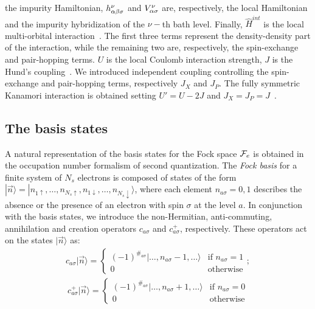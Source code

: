\documentclass[final,3p,10pt]{elsarticle}
\newcommand{\ket}[1]
{|#1\rangle}
\def\a{\alpha}       \def\b{\beta}   \def\g{\gamma}   \def\d{\delta}
\def\up{\uparrow} \def\down{\downarrow} \def\dw{\downarrow}
\begin{document}
the impurity Hamiltonian, 
$h_{\a\b\s}^\nu$ and $V_{\a\s}^\nu$ are, respectively, the local Hamiltonian
and the impurity hybridization of the $\nu-$th bath level. 
  Finally, $\hat{H}^{int}$ is the local
  multi-orbital interaction~\cite{Georges2013ACMP}.
  The first three terms represent the density-density part of the
  interaction, while the remaining two are,
  respectively, the spin-exchange and pair-hopping terms. 
  $U$ is the local Coulomb interaction strength, $J$ is the Hund's
  coupling~\cite{Georges2013ACMP}. We introduced
  independent coupling controlling the spin-exchange and pair-hopping terms,
  respectively $J_X$ and $J_P$. The fully symmetric Kanamori
  interaction is obtained setting $U'=U-2J$ and
  $J_X=J_P=J$~\cite{Georges2013ACMP}.

\subsection{The  basis states}\label{sSecBasis}
A natural representation of the basis states for the Fock space ${\cal F}_e$
is obtained in the occupation number formalism of second quantization.
The \textit{Fock basis} for a finite system of $N_s$ electrons is
composed of states of the form
$\ket{\vec{n}}=\ket{n_{1\up},\dots,n_{N_s\up},n_{1\dw},\dots,n_{N_s\dw}}$, 
where each element $n_{a\sigma}=0,1$ describes the absence or the
presence of an electron with spin $\sigma$ at the level $a$. In
conjunction with the basis states, we introduce the non-Hermitian, anti-commuting, annihilation and
creation operators $c_{a\sigma}$ and
$c^{+}_{a\sigma}$, respectively. These operators act on the states
$\ket{\vec{n}}$ as:  
\begin{equation}
  \begin{aligned}
    c_{a\sigma}\ket{\vec{n}}=
    \begin{cases}
      (-1)^{\#_{a\sigma}}\ket{\dots,n_{a\sigma}\!-\!1,\dots}
      &\text{if $n_{a\sigma}\!=\! 1$}\\
      0 &\text{otherwise}
    \end{cases};
  \end{aligned}
\end{equation}
    \begin{equation}
  \begin{aligned}
    c^{+}_{a\sigma}\ket{\vec{n}}=
     \begin{cases}
      (-1)^{\#_{a\sigma}}\ket{\dots,n_{a\sigma}\!+\!1,\dots}
      & \text{if $n_{a\sigma}\!=\! 0$}\\
      0 & \text{otherwise}
    \end{cases}    
  \end{aligned}
\end{equation}
\end{document}
